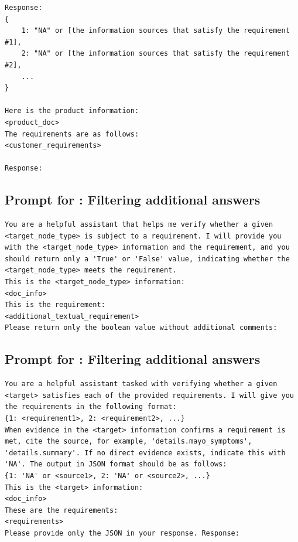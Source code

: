 \begin{mdframed}[backgroundcolor=cyan!5, linecolor=black, linewidth=2pt, innerleftmargin=10pt, innerrightmargin=10pt, innertopmargin=3pt, innerbottommargin=10pt]
\begin{lstlisting}
Response:
{
    1: "NA" or [the information sources that satisfy the requirement #1], 
    2: "NA" or [the information sources that satisfy the requirement #2], 
    ...
}

Here is the product information:
<product_doc>
The requirements are as follows:
<customer_requirements>

Response: 
\end{lstlisting}
\end{mdframed}

\begin{mdframed}[backgroundcolor=lime!10, linecolor=black, linewidth=2pt, innerleftmargin=10pt, innerrightmargin=10pt, innertopmargin=3pt, innerbottommargin=10pt]
\section*{Prompt for \magt: Filtering additional answers}
\begin{lstlisting}
You are a helpful assistant that helps me verify whether a given <target_node_type> is subject to a requirement. I will provide you with the <target_node_type> information and the requirement, and you should return only a 'True' or 'False' value, indicating whether the <target_node_type> meets the requirement.
This is the <target_node_type> information:
<doc_info>
This is the requirement:
<additional_textual_requirement>
Please return only the boolean value without additional comments:
\end{lstlisting}
\end{mdframed}


\begin{mdframed}[backgroundcolor=pink!25, linecolor=black, linewidth=2pt, innerleftmargin=10pt, innerrightmargin=10pt, innertopmargin=3pt, innerbottommargin=10pt]
\section*{Prompt for \primekgt: Filtering additional answers}
\begin{lstlisting}
You are a helpful assistant tasked with verifying whether a given <target> satisfies each of the provided requirements. I will give you the requirements in the following format:
{1: <requirement1>, 2: <requirement2>, ...}
When evidence in the <target> information confirms a requirement is met, cite the source, for example, 'details.mayo_symptoms', 'details.summary'. If no direct evidence exists, indicate this with 'NA'. The output in JSON format should be as follows:
{1: 'NA' or <source1>, 2: 'NA' or <source2>, ...}
This is the <target> information:
<doc_info>
These are the requirements:
<requirements>
Please provide only the JSON in your response. Response:
\end{lstlisting}
\end{mdframed}


